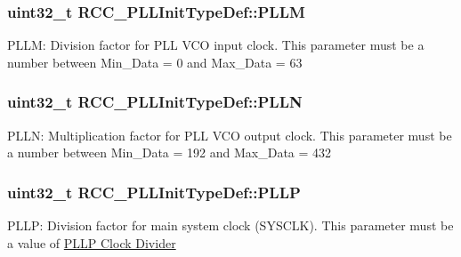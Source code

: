 \subsubsection[{\texorpdfstring{P\+L\+LM}{PLLM}}]{\setlength{\rightskip}{0pt plus 5cm}uint32\+\_\+t R\+C\+C\+\_\+\+P\+L\+L\+Init\+Type\+Def\+::\+P\+L\+LM}\hypertarget{struct_r_c_c___p_l_l_init_type_def_af8ae37696b35fd358c1ec1f6391158a4}{}\label{struct_r_c_c___p_l_l_init_type_def_af8ae37696b35fd358c1ec1f6391158a4}
P\+L\+LM\+: Division factor for P\+LL V\+CO input clock. This parameter must be a number between Min\+\_\+\+Data = 0 and Max\+\_\+\+Data = 63 
\subsubsection[{\texorpdfstring{P\+L\+LN}{PLLN}}]{\setlength{\rightskip}{0pt plus 5cm}uint32\+\_\+t R\+C\+C\+\_\+\+P\+L\+L\+Init\+Type\+Def\+::\+P\+L\+LN}\hypertarget{struct_r_c_c___p_l_l_init_type_def_a2482608639ebfffc51a41135c979369b}{}\label{struct_r_c_c___p_l_l_init_type_def_a2482608639ebfffc51a41135c979369b}
P\+L\+LN\+: Multiplication factor for P\+LL V\+CO output clock. This parameter must be a number between Min\+\_\+\+Data = 192 and Max\+\_\+\+Data = 432 
\subsubsection[{\texorpdfstring{P\+L\+LP}{PLLP}}]{\setlength{\rightskip}{0pt plus 5cm}uint32\+\_\+t R\+C\+C\+\_\+\+P\+L\+L\+Init\+Type\+Def\+::\+P\+L\+LP}\hypertarget{struct_r_c_c___p_l_l_init_type_def_a4ecedf3ef401fa564aa636824fc3ded0}{}\label{struct_r_c_c___p_l_l_init_type_def_a4ecedf3ef401fa564aa636824fc3ded0}
P\+L\+LP\+: Division factor for main system clock (S\+Y\+S\+C\+LK). This parameter must be a value of \hyperlink{group___r_c_c___p_l_l_p___clock___divider}{P\+L\+LP Clock Divider} 
